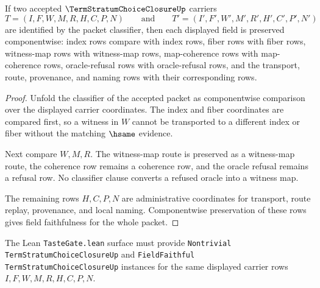 \begin{theorem}
\label{thm:term-stratum-choice-closure-field-faithfulness}
If two accepted $\TermStratumChoiceClosureUp$ carriers
$$
T=(I,F,W,M,R,H,C,P,N)
\qquad\text{and}\qquad
T'=(I',F',W',M',R',H',C',P',N')
$$
are identified by the packet classifier, then each displayed field is preserved componentwise: index rows compare with index rows, fiber rows with fiber rows, witness-map rows with witness-map rows, map-coherence rows with map-coherence rows, oracle-refusal rows with oracle-refusal rows, and the transport, route, provenance, and naming rows with their corresponding rows.
\end{theorem}
\begin{proof}
Unfold the classifier of the accepted packet as componentwise comparison over the displayed carrier coordinates. The index and fiber coordinates are compared first, so a witness in $W$ cannot be transported to a different index or fiber without the matching $\hsame$ evidence.

Next compare $W,M,R$. The witness-map route is preserved as a witness-map route, the coherence row remains a coherence row, and the oracle refusal remains a refusal row. No classifier clause converts a refused oracle into a witness map.

The remaining rows $H,C,P,N$ are administrative coordinates for transport, route replay, provenance, and local naming. Componentwise preservation of these rows gives field faithfulness for the whole packet.
\end{proof}



The Lean \texttt{TasteGate.lean} surface must provide \texttt{Nontrivial TermStratumChoiceClosureUp} and \texttt{FieldFaithful TermStratumChoiceClosureUp} instances for the same displayed carrier rows $I,F,W,M,R,H,C,P,N$.

